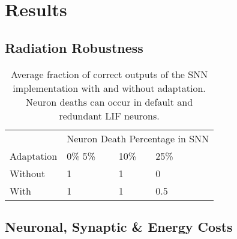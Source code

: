\section{Results}\label{sec:results}

\subsection{Radiation Robustness}\label{subsec:algorithm_performance}

\begin{table}[H]
\caption{Average fraction of correct outputs of the SNN implementation with and without adaptation. Neuron deaths can occur in default and redundant LIF neurons.}
\begin{tabular}{llllll}
        & \multicolumn{5}{l}{Neuron Death Percentage in SNN} \\ \cmidrule{2-6}
        Adaptation & 0\%   5\% & 10\%    & 25\%     \\ \hline
        Without      & 1 &  1    & 0                 \\
        With      & 1 & 1    & 0.5                   \\    
\end{tabular}
\end{table}


\subsection{Neuronal, Synaptic \& Energy Costs}\label{subsec:results_neuronal_synaptic_overcapacity}

